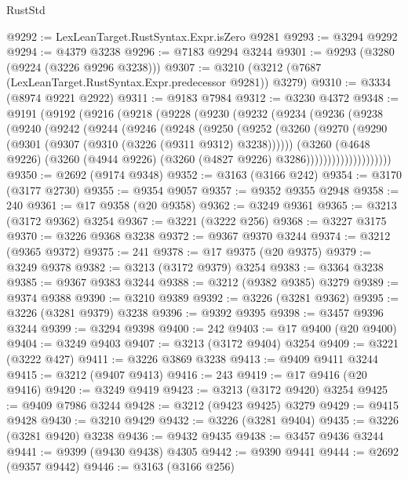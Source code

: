 \begin{lexlean}{RustStd}
\begin{coremodule}
{\begin{coremodule}
{{{{{{{{{{{{{{{{{{{{{{{{{{@9292 := LexLeanTarget.RustSyntax.Expr.isZero @9281
@9293 := @3294 @9292
@9294 := @4379 @3238
@9296 := @7183 @9294 @3244
@9301 := @9293 (@3280 (@9224 (@3226 @9296 @3238)))
@9307 := @3210 (@3212 (@7687 (LexLeanTarget.RustSyntax.Expr.predecessor @9281)) @3279)
@9310 := @3334 (@8974 @9221 @2922)
@9311 := @9183 @7984
@9312 := @3230 @4372
@9348 := @9191
    (@9192
      (@9216
        (@9218
          (@9228
            (@9230
              (@9232
                (@9234
                  (@9236
                    (@9238
                      (@9240
                        (@9242
                          (@9244
                            (@9246
                              (@9248
                                (@9250
                                  (@9252
                                    (@3260
                                      (@9270
                                        (@9290 (@9301 (@9307 (@9310 (@3226 (@9311 @9312) @3238))))))
                                      (@3260
                                        (@4648 @9226)
                                        (@3260
                                          (@4944 @9226)
                                          (@3260 (@4827 @9226) @3286))))))))))))))))))))
@9350 := @2692 (@9174 @9348)
@9352 := @3163 (@3166 @242)
@9354 := @3170 (@3177 @2730)
@9355 := @9354 @9057
@9357 := @9352 @9355 @2948
@9358 := 240
@9361 := @17 @9358 (@20 @9358)
@9362 := @3249 @9361
@9365 := @3213 (@3172 @9362) @3254
@9367 := @3221 (@3222 @256)
@9368 := @3227 @3175
@9370 := @3226 @9368 @3238
@9372 := @9367 @9370 @3244
@9374 := @3212 (@9365 @9372)
@9375 := 241
@9378 := @17 @9375 (@20 @9375)
@9379 := @3249 @9378
@9382 := @3213 (@3172 @9379) @3254
@9383 := @3364 @3238
@9385 := @9367 @9383 @3244
@9388 := @3212 (@9382 @9385) @3279
@9389 := @9374 @9388
@9390 := @3210 @9389
@9392 := @3226 (@3281 @9362)
@9395 := @3226 (@3281 @9379) @3238
@9396 := @9392 @9395
@9398 := @3457 @9396 @3244
@9399 := @3294 @9398
@9400 := 242
@9403 := @17 @9400 (@20 @9400)
@9404 := @3249 @9403
@9407 := @3213 (@3172 @9404) @3254
@9409 := @3221 (@3222 @427)
@9411 := @3226 @3869 @3238
@9413 := @9409 @9411 @3244
@9415 := @3212 (@9407 @9413)
@9416 := 243
@9419 := @17 @9416 (@20 @9416)
@9420 := @3249 @9419
@9423 := @3213 (@3172 @9420) @3254
@9425 := @9409 @7986 @3244
@9428 := @3212 (@9423 @9425) @3279
@9429 := @9415 @9428
@9430 := @3210 @9429
@9432 := @3226 (@3281 @9404)
@9435 := @3226 (@3281 @9420) @3238
@9436 := @9432 @9435
@9438 := @3457 @9436 @3244
@9441 := @9399 (@9430 @9438) @4305
@9442 := @9390 @9441
@9444 := @2692 (@9357 @9442)
@9446 := @3163 (@3166 @256)
}}}}}}}}}}}}}}}}}}}}}}}}}}
\end{coremodule}}
\end{coremodule}
\end{lexlean}
